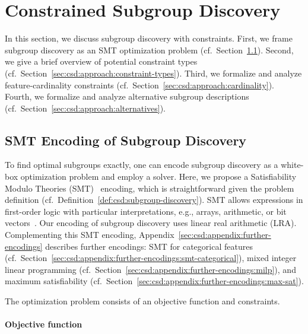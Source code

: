 \documentclass{article}
\theoremstyle{definition}
\begin{document}
\section{Constrained Subgroup Discovery}
\label{sec:csd:approach}

In this section, we discuss subgroup discovery with constraints.
First, we frame subgroup discovery as an SMT optimization problem (cf.~Section~\ref{sec:csd:approach:smt}).
Second, we give a brief overview of potential constraint types (cf.~Section~\ref{sec:csd:approach:constraint-types}).
Third, we formalize and analyze feature-cardinality constraints (cf.~Section~\ref{sec:csd:approach:cardinality}).
Fourth, we formalize and analyze alternative subgroup descriptions (cf.~Section~\ref{sec:csd:approach:alternatives}).

\subsection{SMT Encoding of Subgroup Discovery}
\label{sec:csd:approach:smt}

To find optimal subgroups exactly, one can encode subgroup discovery as a white-box optimization problem and employ a solver.
Here, we propose a Satisfiability Modulo Theories (SMT)~\cite{barrett2018satisfiability, nieuwenhuis2006sat} encoding, which is straightforward given the problem definition (cf.~Definition~\ref{def:csd:subgroup-discovery}).
SMT allows expressions in first-order logic with particular interpretations, e.g., arrays, arithmetic, or bit vectors~\cite{barrett2018satisfiability}.
Our encoding of subgroup discovery uses linear real arithmetic (LRA).
Complementing this SMT encoding, Appendix~\ref{sec:csd:appendix:further-encodings} describes further encodings:
SMT for categorical features (cf.~Section~\ref{sec:csd:appendix:further-encodings:smt-categorical}), mixed integer linear programming (cf.~Section~\ref{sec:csd:appendix:further-encodings:milp}), and maximum satisfiability (cf.~Section~\ref{sec:csd:appendix:further-encodings:max-sat}).

The optimization problem consists of an objective function and constraints.

\paragraph{Objective function}
\end{document}
